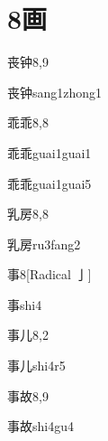 
\section*{8画}

\begin{entry}{丧钟}{8,9}
  \begin{phonetics}{丧钟}{sang1zhong1}
  \end{phonetics}
\end{entry}

\begin{entry}{乖乖}{8,8}
  \begin{phonetics}{乖乖}{guai1guai1}
  \end{phonetics}
  \begin{phonetics}{乖乖}{guai1guai5}
  \end{phonetics}
\end{entry}

\begin{entry}{乳房}{8,8}
  \begin{phonetics}{乳房}{ru3fang2}
  \end{phonetics}
\end{entry}

\begin{entry}{事}{8}[Radical 亅]
  \begin{phonetics}{事}{shi4}
  \end{phonetics}
\end{entry}

\begin{entry}{事儿}{8,2}
  \begin{phonetics}{事儿}{shi4r5}
  \end{phonetics}
\end{entry}

\begin{entry}{事故}{8,9}
  \begin{phonetics}{事故}{shi4gu4}
  \end{phonetics}
\end{entry}

